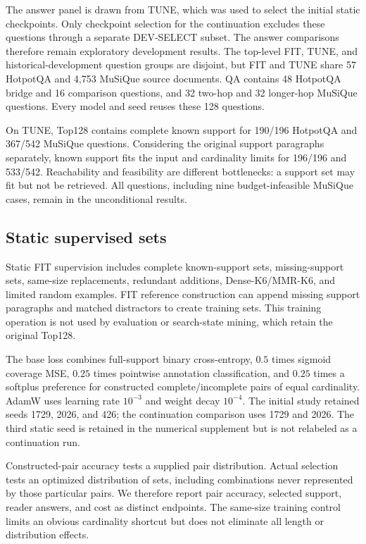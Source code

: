 \documentclass[preprint,12pt]{elsarticle}
\begin{document}


The answer panel is drawn from TUNE, which was used to select the initial static checkpoints. Only checkpoint selection for the continuation excludes these questions through a separate DEV-SELECT subset. The answer comparisons therefore remain exploratory development results. The top-level FIT, TUNE, and historical-development question groups are disjoint, but FIT and TUNE share 57 HotpotQA and 4,753 MuSiQue source documents. QA contains 48 HotpotQA bridge and 16 comparison questions, and 32 two-hop and 32 longer-hop MuSiQue questions. Every model and seed reuses these 128 questions.

On TUNE, Top128 contains complete known support for 190/196 HotpotQA and 367/542 MuSiQue questions. Considering the original support paragraphs separately, known support fits the input and cardinality limits for 196/196 and 533/542. Reachability and feasibility are different bottlenecks: a support set may fit but not be retrieved. All questions, including nine budget-infeasible MuSiQue cases, remain in the unconditional results.

\subsection{Static supervised sets}
Static FIT supervision includes complete known-support sets, missing-support sets, same-size replacements, redundant additions, Dense-K6/MMR-K6, and limited random examples. FIT reference construction can append missing support paragraphs and matched distractors to create training sets. This training operation is not used by evaluation or search-state mining, which retain the original Top128.

The base loss combines full-support binary cross-entropy, $0.5$ times sigmoid coverage MSE, $0.25$ times pointwise annotation classification, and $0.25$ times a softplus preference for constructed complete/incomplete pairs of equal cardinality. AdamW uses learning rate $10^{-3}$ and weight decay $10^{-4}$. The initial study retained seeds 1729, 2026, and 426; the continuation comparison uses 1729 and 2026. The third static seed is retained in the numerical supplement but is not relabeled as a continuation run.

Constructed-pair accuracy tests a supplied pair distribution. Actual selection tests an optimized distribution of sets, including combinations never represented by those particular pairs. We therefore report pair accuracy, selected support, reader answers, and cost as distinct endpoints. The same-size training control limits an obvious cardinality shortcut but does not eliminate all length or distribution effects.
\end{document}
